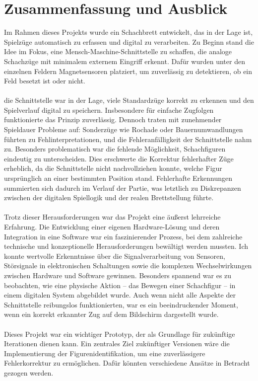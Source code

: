 \documentclass[a4paper]{article}
\begin{document}
\section{Zusammenfassung und Ausblick}
\label{sec:zusammenfassung_und_ausblick}
Im Rahmen dieses Projekts wurde ein Schachbrett entwickelt, das in der Lage ist, Spielzüge automatisch zu erfassen und digital zu verarbeiten. Zu Beginn stand die Idee im Fokus, eine Mensch-Maschine-Schnittstelle zu schaffen, die analoge Schachzüge mit minimalem externem Eingriff erkennt. Dafür wurden unter den einzelnen Feldern Magnetsensoren platziert, um zuverlässig zu detektieren, ob ein Feld besetzt ist oder nicht.\\
\\
die Schnittstelle war in der Lage, viele Standardzüge korrekt zu erkennen und den Spielverlauf digital zu speichern. Insbesondere für einfache Zugfolgen funktionierte das Prinzip zuverlässig. Dennoch traten mit zunehmender Spieldauer Probleme auf: Sonderzüge wie Rochade oder Bauernumwandlungen führten zu Fehlinterpretationen, und die Fehleranfälligkeit der Schnittstelle nahm zu. Besonders problematisch war die fehlende Möglichkeit, Schachfiguren eindeutig zu unterscheiden. Dies erschwerte die Korrektur fehlerhafter Züge erheblich, da die Schnittstelle nicht nachvollziehen konnte, welche Figur ursprünglich an einer bestimmten Position stand. Fehlerhafte Erkennungen summierten sich dadurch im Verlauf der Partie, was letztlich zu Diskrepanzen zwischen der digitalen Spiellogik und der realen Brettstellung führte. \\
\\
Trotz dieser Herausforderungen war das Projekt eine äußerst lehrreiche Erfahrung. Die Entwicklung einer eigenen Hardware-Lösung und deren Integration in eine Software war ein faszinierender Prozess, bei dem zahlreiche technische und konzeptionelle Herausforderungen bewältigt werden mussten. Ich konnte wertvolle Erkenntnisse über die Signalverarbeitung von Sensoren, Störsignale in elektronischen Schaltungen sowie die komplexen Wechselwirkungen zwischen Hardware und Software gewinnen. Besonders spannend war es zu beobachten, wie eine physische Aktion – das Bewegen einer Schachfigur – in einem digitalen System abgebildet wurde. Auch wenn nicht alle Aspekte der Schnittstelle reibungslos funktionierten, war es ein beeindruckender Moment, wenn ein korrekt erkannter Zug auf dem Bildschirm dargestellt wurde.\\  
\\
Dieses Projekt war ein wichtiger Prototyp, der als Grundlage für zukünftige Iterationen dienen kann. Ein zentrales Ziel zukünftiger Versionen wäre die Implementierung der Figurenidentifikation, um eine zuverlässigere Fehlerkorrektur zu ermöglichen. Dafür könnten verschiedene Ansätze in Betracht gezogen werden.
\end{document}
